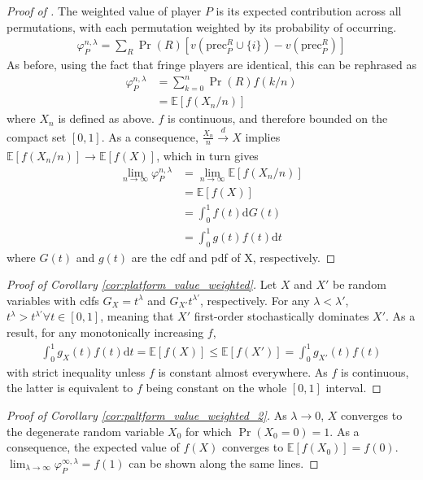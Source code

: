 \documentclass[a4paper]{article}
\newcommand{\dt}{\mathrm{d}t}
\newcommand{\dG}{\mathrm{d}G}
\newcommand{\E}{\mathbb{E}}
\newcommand{\precede}{\mathrm{prec}}
\begin{document}
\begin{proof}[Proof of ]
    The weighted value of player $P$ is its expected contribution across all permutations, with each permutation weighted by its probability of occurring.
    \begin{align*}
        \varphi_P^{n, \lambda} = \sum_R \Pr(R) [v(\precede_P^R \cup \{i\}) - v(\precede_P^R)]
    \end{align*}
    As before, using the fact that fringe players are identical, this can be rephrased as
    \begin{align*}
        \varphi_P^{n, \lambda} &= \sum_{k=0}^n \Pr(R) f(k/n) \\
        &= \E[f(X_n / n)]
    \end{align*}
    where $X_n$ is defined as above.
    $f$ is continuous, and therefore bounded on the compact set $[0, 1]$.
    As a consequence, $\frac{X_n}{n} \xrightarrow[]{d} X$ implies $\E[f(X_n / n)] \to \E[f(X)]$, which in turn gives
    \begin{align*}
        \lim_{n \to \infty} \varphi_P^{n, \lambda} &= \lim_{n \to \infty} \E[f(X_n / n)] \\
        &= \E[f(X)] \\
        &= \int_0^1 f(t) \dG(t) \\
        &= \int_0^1 g(t)f(t) \dt
    \end{align*}
    where $G(t)$ and $g(t)$ are the cdf and pdf of X, respectively.
\end{proof}

\begin{proof}[Proof of Corollary \ref{cor:platform_value_weighted}]
    Let $X$ and $X'$ be random variables with cdfs $G_X = t^\lambda$ and $G_{X'}t^{\lambda'}$, respectively.
    For any $\lambda < \lambda'$, $t^\lambda > t^{\lambda'} \forall t \in [0, 1]$, meaning that $X'$ first-order stochastically dominates $X'$.
    As a result, for any monotonically increasing $f$,
    \begin{align*}
        \int_0^1 g_X(t)f(t) \dt = \E[f(X)] \leq \E[f(X')] = \int_0^1 g_{X'}(t)f(t)
    \end{align*}
    with strict inequality unless $f$ is constant almost everywhere.
    As $f$ is continuous, the latter is equivalent to $f$ being constant on the whole $[0, 1]$ interval.
\end{proof}

\begin{proof}[Proof of Corollary \ref{cor:paltform_value_weighted_2}]
    As $\lambda \to 0$, $X$ converges to the degenerate random variable $X_0$ for which $\Pr(X_0 = 0) = 1$.
    As a consequence, the expected value of $f(X)$ converges to $\E[f(X_0)] = f(0)$.
    $\lim_{\lambda \to \infty} \varphi^{\infty, \lambda}_P = f(1)$ can be shown along the same lines.
\end{proof}
\end{document}
